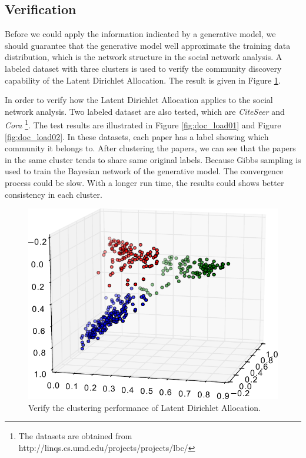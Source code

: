 \documentclass[letterpaper]{article}
\begin{document}
\subsection{Verification}

Before we could apply the information indicated by a generative model, we should guarantee that the generative model well approximate the training data distribution, which is the network structure in the social network analysis.
A labeled dataset with three clusters is used to verify the community discovery capability of the Latent Dirichlet Allocation.
The result is given in Figure \ref{fig:cluster3}.

In order to verify how the Latent Dirichlet Allocation applies to the social network analysis.
Two labeled dataset are also tested, which are \emph{CiteSeer} and \emph{Cora}
\footnote{The datasets are obtained from http://linqs.cs.umd.edu/projects/projects/lbc/}.
The test results are illustrated in Figure \ref{fig:doc_load01} and Figure \ref{fig:doc_load02}.
In these datasets, each paper has a label showing which community it belongs to.
After clustering the papers, we can see that the papers in the same cluster tends to share same original labels.
Because Gibbs sampling is used to train the Bayesian network of the generative model.
The convergence process could be slow.
With a longer run time, the results could shows better consistency in each cluster.

\begin{figure}
\centering
\includegraphics[width=0.8\linewidth]{./fig/cluster3}
\caption{Verify the clustering performance of Latent Dirichlet Allocation.}
\label{fig:cluster3}
\end{figure}
\end{document}
